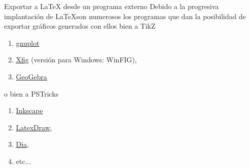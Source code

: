 \documentclass[10pt]{beamer}
\begin{document}
\begin{frame}[fragile]{Exportar a \LaTeX{} desde un programa externo}
Debido a la progresiva implantaci\'on de \LaTeX  son  numerosos los programas que 
dan la posibilidad de exportar gr\'aficos  generados con ellos bien a TikZ
\begin{enumerate}
\item \href{https://ctan.org/pkg/gnuplottex}{\color{blue} gnuplot}
\item \href{https://mcj.sourceforge.net/latex_and_xfig.html}{\color{blue} Xfig} {\small (versi\'on para Windows: WinFIG)}, 
\item \href{https://www.overleaf.com/learn/latex/LaTeX_Graphics_using_TikZ%3A_A_Tutorial_for_Beginners_(Part_2)%E2%80%94Generating_TikZ_Code_from_GeoGebra}{\color{blue} GeoGebra}

\end{enumerate}
o bien a PSTricks
\begin{enumerate}
\item  \href{https://inkscape-manuals.readthedocs.io/en/latest/export-other-formats.html}{\color{blue} Inkscape}
\item \href{http://latexdraw.sourceforge.net}{\color{blue} LatexDraw},
\item \href{http://dia-installer.de/index.html.en}{\color{blue} Dia},
\item etc...
\end{enumerate}
\end{frame}
\end{document}
